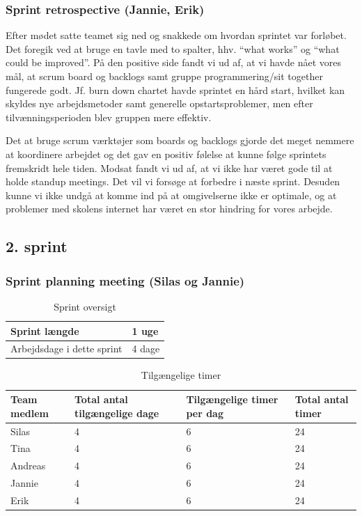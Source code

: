 \documentclass[12pt, a4paper]{report}
\begin{document}
\subsubsection{Sprint retrospective (Jannie, Erik)}

Efter mødet satte teamet sig ned og snakkede om hvordan sprintet var forløbet. Det foregik ved at bruge en tavle med to spalter, hhv. “what works” og “what could be improved”. På den positive side fandt vi ud af, at vi havde nået vores mål, at scrum board og backlogs samt gruppe programmering/sit together fungerede godt. Jf. burn down chartet havde sprintet en hård start, hvilket kan skyldes nye arbejdsmetoder samt generelle opstartsproblemer, men efter tilvænningsperioden blev gruppen mere effektiv.

Det at bruge scrum værktøjer som boards og backlogs gjorde det meget nemmere at koordinere arbejdet og det gav en positiv følelse at kunne følge sprintets fremskridt hele tiden. Modsat fandt vi ud af, at vi ikke har været gode til at holde standup meetings. Det vil vi forsøge at forbedre i næste sprint. Desuden kunne vi ikke undgå at komme ind på at omgivelserne ikke er optimale, og at problemer med skolens internet har været en stor hindring for vores arbejde.

\subsection{2. sprint}
\subsubsection{Sprint planning meeting (Silas og Jannie)}
\begin{table}[ht]
\centering
\caption{Sprint oversigt}
\label{sprint2oversigt}

\begin{tabular}{| l | l |}

\hline
Sprint længde & 1 uge \\ \hline
Arbejdsdage i dette sprint & 4 dage \\
\hline
\end{tabular}
\end{table}

\begin{table}[ht]
\caption{Tilgængelige timer}
\label{sprint2timer}
\begin{tabular}{| p{3cm} | p{4cm} | p{4cm} | p{4cm} |}
\hline
Team medlem & Total antal tilgængelige dage & Tilgængelige timer per dag & Total antal timer \\ \hline
Silas & 4 & 6 & 24 \\ \hline
Tina & 4 & 6 & 24 \\ \hline
Andreas & 4 & 6 & 24 \\ \hline
Jannie & 4 & 6 & 24 \\ \hline
Erik & 4 & 6 & 24 \\
\hline
\end{tabular}
\end{table}
\end{document}
